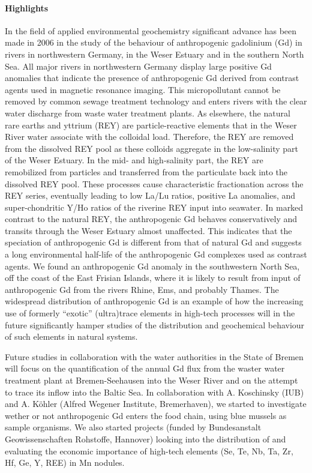 \paragraph{Highlights}
In the field of applied environmental geochemistry significant advance
has been made in 2006 in the study of the behaviour of anthropogenic
gadolinium (Gd) in rivers in northwestern Germany, in the Weser
Estuary and in the southern North Sea. All major rivers in
northwestern Germany display large positive Gd anomalies that indicate
the presence of anthropogenic Gd derived from contrast agents used in
magnetic resonance imaging. This mi\-cro\-pol\-lu\-tant cannot be removed by
common sewage treatment technology and enters rivers with the clear
water discharge from waste water treatment plants. As elsewhere, the
natural rare earths and yttrium (REY) are particle-reactive elements
that in the Weser River water associate with the colloidal
load. Therefore, the REY are removed from the dissolved REY pool as
these colloids aggregate in the low-salinity part of the Weser
Estuary. In the mid- and high-salinity part, the REY are remobilized
from particles and transferred from the particulate back into the
dissolved REY pool. These processes cause characteristic fractionation
across the REY series, eventually leading to low La/Lu ratios,
positive La anomalies, and super-chondritic Y/Ho ratios of the
riverine REY input into seawater. In marked contrast to the natural
REY, the anthropogenic Gd behaves conservatively and transits through the
Weser Estuary almost unaffected. This indicates that the speciation of
anthropogenic Gd is different from that of natural Gd and suggests a
long environmental half-life of the anthropogenic Gd complexes used as
contrast agents. We found an anthropogenic Gd anomaly in the
southwestern North Sea, off the coast of the East Frisian Islands,
where it is likely to result from input of anthropogenic Gd from the
rivers Rhine, Ems, and probably Thames. The widespread distribution of
anthropogenic Gd is an example of how the increasing use of formerly
``exotic'' (ultra)trace elements in high-tech processes will in the
future significantly hamper studies of the distribution and
geochemical behaviour of such elements in natural systems.

Future studies in collaboration with the water authorities in
the State of Bremen will focus on the quantification of the annual Gd
flux from the waster water treatment plant at Bremen-Seehausen into
the Weser River and on the attempt to trace its inflow into the Baltic
Sea. In collaboration with A. Koschinsky (IUB) and A. K\"ohler (Alfred
Wegener Institute, Bremerhaven), we started to investigate wether or
not anthropogenic Gd enters the food chain, using blue mussels as
sample organisms. We also started projects (funded by Bundesanstalt
Geowissenschaften Rohstoffe, Hannover) looking into the distribution
of and evaluating the economic importance of high-tech elements (Se,
Te, Nb, Ta, Zr, Hf, Ge, Y, REE) in Mn nodules.

